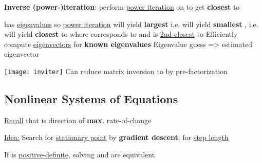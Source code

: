 \hSep %

\textbf{Inverse (power-)iteration}: perform \underline{power iteration} on
 to get  \textbf{closest} to \iMbox{\sigma}
\begin{itemize}

      \vItem
             has \underline{eigenvalues}
             so \underline{power iteration} will yield
            \textbf{largest }
      \vItem
            i.e. will yield \textbf{smallest
                  }, i.e. will yield
             \textbf{closest} to \iMbox{\sigma}
      \vItem
            where  corresponds to
             and  is \underline{2nd-closest} to \iMbox{\sigma}
      \vItem
            Efficiently compute \underline{eigenvectors} for \textbf{known eigenvalues}
            \iMbox{\sigma}
      \vItem
            Eigenvalue guess => estimated eigenvector

            \texttt{[image: inviter]}
      \vItem
            Can reduce matrix inversion  to  by
            pre-factorization
\end{itemize}


\subsection*{Nonlinear Systems of Equations}

\underline{Recall} that  is direction of \textbf{max.}
rate-of-change 

\underline{Idea:} Search for \underline{stationary point} by \textbf{gradient descent}:
for \underline{step length} \iMbox{\alpha}

\hSep %

If  is \underline{positive-definite}, solving  and
are equivalent


